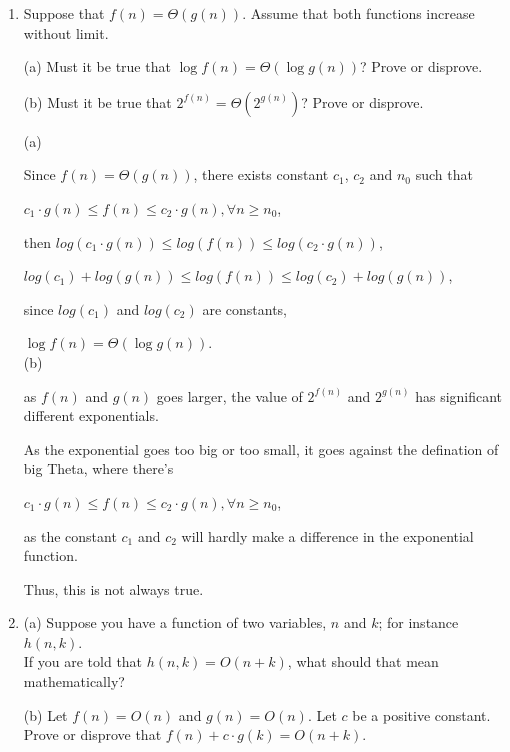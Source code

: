 \documentclass[12pt]{article}
\begin{document}
  
\pagestyle{empty}
 




\vskip 0.5in


\begin{enumerate}

\item 
Suppose that $f(n) = \Theta(g(n))$. Assume that both functions increase without limit.

(a) Must it be true that $\log f(n) = \Theta(\log g(n))$? Prove or disprove.

(b)  Must it be  true that $2^{f(n)} = \Theta(2^{g(n)})$? Prove or disprove.\\


{\color{blue}{\bf Answer:\\}}

(a) 

Since $f(n) = \Theta(g(n))$, there exists constant $c_1$, $c_2$ and $n_0$ such that 

 $c_1\cdot g(n) \le f(n) \le c_2\cdot g(n),  \forall n \geq n_0$,

 then $log(c_1\cdot g(n)) \le log(f(n)) \le log(c_2\cdot g(n))$,

 $log(c_1) + log(g(n)) \le log(f(n)) \le log(c_2) + log(g(n))$,

 since $log(c_1)$ and $log(c_2)$ are constants,  
 
$\log f(n) = \Theta(\log g(n))$.\\


(b) 

as $f(n)$ and $g(n)$ goes larger, the value of $2^{f(n)}$ and $2^{g(n)}$ has significant different exponentials. 

As the exponential goes too big or too small, it goes against the defination of big Theta, where there's

$c_1\cdot g(n) \le f(n) \le c_2\cdot g(n),  \forall n \geq n_0$,

as the constant $c_1$ and $c_2$ will hardly make a difference in the exponential function.

Thus, this is not always true.


\newpage

\item
(a) Suppose you have a function of two variables, $n$ and $k$; for instance $h(n,k)$. \\ If you are told  that $h(n,k) = O(n+k)$, what should that mean mathematically? 

(b) 
 Let $f(n) = O(n)$ and $g(n) = O(n)$.  Let $c$ be a positive constant. \\   
Prove or disprove that  $f(n) + c\cdot g(k) = O(n+k)$. \\



\end{enumerate}
\end{document}
